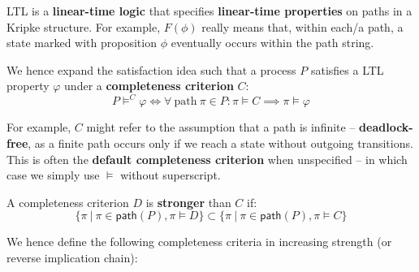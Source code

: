 \documentclass[99-notes-packed.tex]{subfiles}
\begin{document}
\begin{background}
    LTL is a \textbf{linear-time logic} that specifies \textbf{linear-time properties} on paths in a Kripke structure. For example, $F(\phi)$ really means that, within each/a path, a state marked with proposition $\phi$ eventually occurs within the path string. 

    We hence expand the satisfaction idea such that a process $P$ satisfies a LTL property $\varphi$ under a \textbf{completeness criterion} $C$: 
    \begin{equation*}
        P \models^{C} \varphi \iff \forall\ \mathrm{path}\ \pi \in P: \pi \models C \implies \pi \models \varphi
    \end{equation*}

    For example, $C$ might refer to the assumption that a path is infinite -- \textbf{deadlock-free}, as a finite path occurs only if we reach a state without outgoing transitions. This is often the \textbf{default completeness criterion} when unspecified -- in which case we simply use $\models$ without superscript. 

    A completeness criterion $D$ is \textbf{stronger} than $C$ if: 
    \begin{equation*}
        \{\pi\ |\ \pi \in \mathsf{path}(P), \pi \models D\} \subset \{\pi\ |\ \pi \in \mathsf{path}(P), \pi \models C\}
    \end{equation*}
\end{background}

We hence define the following completeness criteria in increasing strength (or reverse implication chain): 

\begin{definition}[Progress]
    
\end{definition}

\begin{definition}[Justness]
    
\end{definition}
\end{document}
